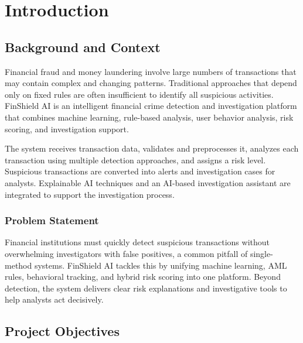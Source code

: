 \documentclass{tietreport}
\author{%
  \texttt{1024170265} Harshit Goyal \\
  \texttt{1024170057} Arnav Gupta \\
  \texttt{1024170274} Dikshit Gupta \\
  \texttt{1024170269} Jasmandeep Sharma%
}
\begin{document}
\maketitle
\tableofcontents


\chapter{Introduction}
\section{Background and Context}

Financial fraud and money laundering involve large numbers of transactions
that may contain complex and changing patterns. Traditional approaches that
depend only on fixed rules are often insufficient to identify all suspicious
activities. FinShield AI is an intelligent financial crime detection and
investigation platform that combines machine learning, rule-based analysis,
user behavior analysis, risk scoring, and investigation support.

The system receives transaction data, validates and preprocesses it,
analyzes each transaction using multiple detection approaches, and assigns
a risk level. Suspicious transactions are converted into alerts and
investigation cases for analysts. Explainable AI techniques and an AI-based
investigation assistant are integrated to support the investigation process.

\subsection{Problem Statement}

Financial institutions must quickly detect suspicious transactions without overwhelming investigators with false positives, a common pitfall of single-method systems. FinShield AI tackles this by unifying machine learning, AML rules, behavioral tracking, and hybrid risk scoring into one platform. Beyond detection, the system delivers clear risk explanations and investigative tools to help analysts act decisively.

\section{Project Objectives}
\end{document}
